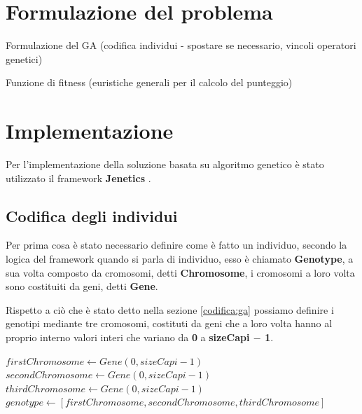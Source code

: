 \documentclass[a4paper, 11pt, oneside]{report}
\begin{document}
            \section{Formulazione del problema}
            Formulazione del GA (codifica individui\label{codifica:ga} - spostare se necessario, vincoli\label{vincoli:ga}
            operatori genetici)
            \par \noindent Funzione di fitness (euristiche generali per il calcolo del punteggio)
            \par {}

            \newpage
            \section{Implementazione}
            Per l'implementazione della soluzione basata su algoritmo genetico è stato utilizzato il framework
            \textbf{Jenetics} \cite{1}.
                \subsection{Codifica degli individui}
                \par \noindent Per prima cosa è stato necessario definire come è fatto un individuo, secondo la logica
                del framework quando si parla di individuo, esso è chiamato \textbf{Genotype}, a sua volta composto
                da cromosomi, detti \textbf{Chromosome}, i cromosomi a loro volta sono costituiti da geni, detti
                \textbf{Gene}.
                \medskip
                \par \noindent Rispetto a ciò che è stato detto nella sezione \ref{codifica:ga} possiamo definire
                i genotipi mediante tre cromosomi, costituti da geni che a loro volta hanno al proprio interno valori
                interi che variano da \textbf{0} a \textbf{sizeCapi $-$ 1}.
                \medskip
                \begin{algorithmic}[1]
                    \State $firstChromosome \gets Gene(0,sizeCapi-1)$
                    \State $secondChromosome \gets Gene(0,sizeCapi-1)$
                    \State $thirdChromosome \gets Gene(0,sizeCapi-1)$
                    \State $genotype \gets [firstChromosome, secondChromosome, thirdChromosome]$
                \end{algorithmic}
\end{document}
